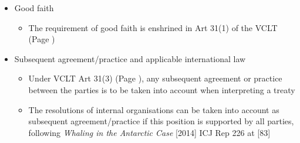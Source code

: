 \begin{itemize}
    \item Good faith
    \begin{itemize}
        \item The requirement of good faith is enshrined in Art 31(1) of the VCLT (Page \pageref{VCLT Art 31})
    \end{itemize}
    \item Subsequent agreement/practice and applicable international law
    \begin{itemize}
        \item Under VCLT Art 31(3) (Page \pageref{VCLT Art 31}), any subsequent agreement or practice between the parties is to be taken into account when interpreting a treaty
        \item The resolutions of internal organisations can be taken into account as subsequent agreement/practice if this position is supported by all parties, following \textit{Whaling in the Antarctic Case} [2014] ICJ Rep 226 at [83]
    \end{itemize}
\end{itemize}

